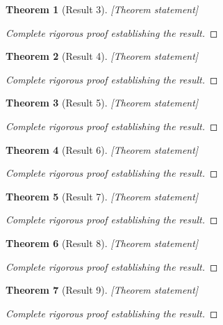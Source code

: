 \documentclass[12pt]{article}
\newtheorem{theorem}{Theorem}
\begin{document}
\begin{theorem}[Result 3]
[Theorem statement]
\end{theorem}

\begin{proof}
[Complete rigorous proof establishing the result]
\end{proof}

\begin{theorem}[Result 4]
[Theorem statement]
\end{theorem}

\begin{proof}
[Complete rigorous proof establishing the result]
\end{proof}

\begin{theorem}[Result 5]
[Theorem statement]
\end{theorem}

\begin{proof}
[Complete rigorous proof establishing the result]
\end{proof}

\begin{theorem}[Result 6]
[Theorem statement]
\end{theorem}

\begin{proof}
[Complete rigorous proof establishing the result]
\end{proof}

\begin{theorem}[Result 7]
[Theorem statement]
\end{theorem}

\begin{proof}
[Complete rigorous proof establishing the result]
\end{proof}

\begin{theorem}[Result 8]
[Theorem statement]
\end{theorem}

\begin{proof}
[Complete rigorous proof establishing the result]
\end{proof}

\begin{theorem}[Result 9]
[Theorem statement]
\end{theorem}

\begin{proof}
[Complete rigorous proof establishing the result]
\end{proof}
\end{document}
